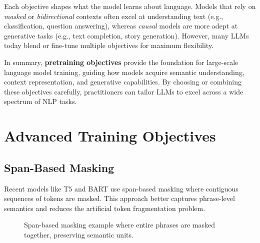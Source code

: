 \noindent
Each objective shapes what the model learns about language. Models that rely on \emph{masked} or \emph{bidirectional} contexts often excel at understanding text (e.g., classification, question answering), whereas \emph{causal} models are more adept at generative tasks (e.g., text completion, story generation). However, many LLMs today blend or fine-tune multiple objectives for maximum flexibility.

\noindent
In summary, \textbf{pretraining objectives} provide the foundation for large-scale language model training, guiding how models acquire semantic understanding, context representation, and generative capabilities. By choosing or combining these objectives carefully, practitioners can tailor LLMs to excel across a wide spectrum of NLP tasks. 

\section{Advanced Training Objectives}
\label{sec:advanced_objectives}

\subsection{Span-Based Masking}
\noindent
Recent models like T5 and BART use span-based masking where contiguous sequences of tokens are masked. This approach better captures phrase-level semantics and reduces the artificial token fragmentation problem.

\begin{figure}[ht]
    \centering
    \caption{Span-based masking example where entire phrases are masked together, preserving semantic units.}
    \label{fig:span_masking}
\end{figure} 

